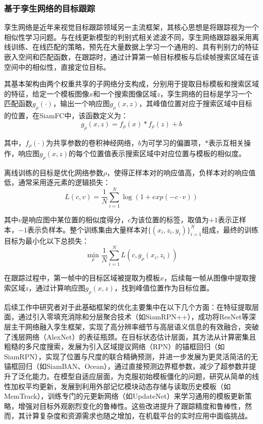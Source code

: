 \subsubsection{基于孪生网络的目标跟踪}
孪生网络是近年来视觉目标跟踪领域另一主流框架，其核心思想是将跟踪视为一个相似性学习问题。与在线更新模型的判别式相关滤波不同，孪生网络跟踪器采用离线训练、在线匹配的策略，预先在大量数据上学习一个通用的、具有判别力的特征嵌入空间和匹配函数，在跟踪时，通过计算第一帧目标模板与后续帧搜索区域在该空间中的相似性，直接定位目标。

其基本架构由两个权重共享的子网络分支构成，分别用于提取目标模板和搜索区域的特征，给定一个模板图像$x$和一个搜索图像区域$z$，孪生网络的目标是学习一个匹配函数$g_\rho(\cdot)$，输出一个响应图$g_\rho(x,z)$，其峰值位置对应于搜索区域中目标的位置，在SiamFC中，该函数定义为：
\begin{equation}
    g_\rho(x, z) = f_\rho(x) * f_\rho(z) + b
\end{equation}

其中，$f_\rho(\cdot)$为共享参数的卷积神经网络，$b$为可学习的偏置项，$*$表示互相关操作，响应图$g_\rho(x,z)$的每个位置值表示搜索区域中对应位置与模板的相似度。

离线训练的目标是优化网络参数$\rho$，使得正样本对的响应值高，负样本对的响应值低，通常采用逐元素的逻辑损失：
\begin{equation}
    L(c,v) = \frac{1}{N} \sum^N_{i=1} \log\left(1 + exp(-c \cdot v)\right)
\end{equation}

其中$v$是响应图中某位置的相似度得分，$c$为该位置的标签，取值为$+1$表示正样本，$-1$表示负样本。整个训练集由大量样本对$\{(x_i, z_i, y_i)\}_{i=1}^N$组成，最终的训练目标为最小化以下总损失：
\begin{equation}
    \min_\rho \frac{1}{N} \sum_{i=1}^N L\left(c, g_\rho(x_i, z_i)\right)
\end{equation}

在跟踪过程中，第一帧中的目标区域被提取为模板$x$，后续每一帧从图像中提取搜索区域$z$，通过计算响应图$g_\rho(x,z)$，找到峰值位置作为目标位置。

后续工作中研究者对于此基础框架的优化主要集中在以下几个方面：在特征提取层面，通过引入零填充消除和分层聚合技术（如SiamRPN++\cite{Li2019SiamRPN++}），成功将ResNet等深层主干网络融入孪生框架，实现了高分辨率细节与高层语义信息的有效融合，突破了浅层网络（AlexNet）的表征瓶颈。在目标状态估计层面，其方法从计算密集且粗糙的多尺度搜索，发展为引入区域提议网络（RPN）的锚框回归（如SiamRPN\cite{Li2018SiamRPN}），实现了位置与尺度的联合精确预测，并进一步发展为更灵活简洁的无锚框回归（如SiamBAN\cite{Chen2023SiamBAN}、Ocean\cite{Zhang2020Ocean}），通过直接预测边界框参数，减少了超参数并提升了泛化能力。在模型自适应层面，为克服初始模板僵化的问题，研究从简单的线性加权平均更新，发展到利用外部记忆模块动态存储与读取历史模板（如MemTrack\cite{Yang2018MemTrack}），训练专门的元更新网络（如UpdateNet\cite{Zhang_2019_ICCV}）来学习通用的模板更新策略，增强对目标外观剧烈变化的鲁棒性。这些改进提升了跟踪精度和鲁棒性，然而，其计算复杂度和资源需求也随之增加，在机载平台的实时应用中面临挑战。


